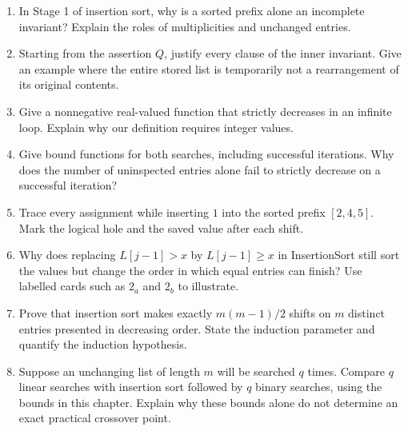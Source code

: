 \begin{enumerate}
absence. Identify precisely which preservation argument fails.
\item In Stage 1 of insertion sort, why is a sorted prefix alone an
incomplete invariant? Explain the roles of multiplicities and unchanged entries.
\item Starting from the assertion $Q$, justify every clause of the inner
invariant. Give an example where the entire stored list is temporarily
not a rearrangement of its original contents.
\item Give a nonnegative real-valued function that strictly decreases
in an infinite loop. Explain why our definition requires integer values.
\item Give bound functions for both searches, including successful
iterations. Why does the number of uninspected entries alone fail to
strictly decrease on a successful iteration?
\item Trace every assignment while inserting $1$ into the sorted prefix
$[2,4,5]$. Mark the logical hole and the saved value after each shift.
\item Why does replacing $L[j-1]>x$ by $L[j-1]\geq x$ in InsertionSort
still sort the values but change the order in which equal entries can finish?
Use labelled cards such as $2_a$ and $2_b$ to illustrate.
\item Prove that insertion sort makes exactly $m(m-1)/2$ shifts on
$m$ distinct entries presented in decreasing order. State the induction
parameter and quantify the induction hypothesis.
\item Suppose an unchanging list of length $m$ will be searched $q$ times.
Compare $q$ linear searches with insertion sort followed by $q$ binary
searches, using the bounds in this chapter. Explain why these bounds alone
do not determine an exact practical crossover point.
\end{enumerate}
